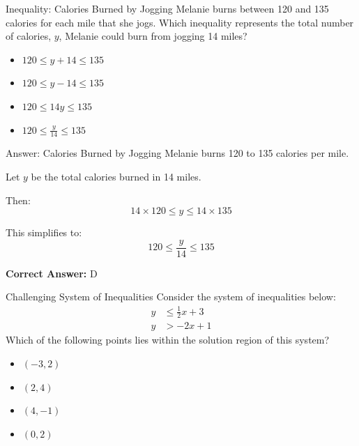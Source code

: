 \documentclass{beamer}
\begin{document}
\begin{frame}{Inequality: Calories Burned by Jogging}
Melanie burns between 120 and 135 calories for each mile that she jogs.  
Which inequality represents the total number of calories, \( y \),  
Melanie could burn from jogging 14 miles?

\vspace{1em}
\begin{itemize}
    \item[\textbf{A.}] \( 120 \leq y + 14 \leq 135 \)
    \item[\textbf{B.}] \( 120 \leq y - 14 \leq 135 \)
    \item[\textbf{C.}] \( 120 \leq 14y \leq 135 \)
    \item[\textbf{D.}] \( 120 \leq \frac{y}{14} \leq 135 \)
\end{itemize}
\end{frame}

\begin{frame}{Answer: Calories Burned by Jogging}
Melanie burns 120 to 135 calories per mile.

Let \( y \) be the total calories burned in 14 miles.

Then:
\[
14 \times 120 \leq y \leq 14 \times 135
\]

This simplifies to:
\[
120 \leq \frac{y}{14} \leq 135
\]

\textbf{Correct Answer:} \(\boxed{\text{D}}\)
\end{frame}

\begin{frame}{Challenging System of Inequalities}
    Consider the system of inequalities below:
    \[
    \begin{aligned}
    y &\leq \frac{1}{2}x + 3 \\
    y &> -2x + 1
    \end{aligned}
    \]
    Which of the following points lies within the solution region of this system?

    \vspace{1em}
    \begin{itemize}
        \item[\textbf{A.}] \((-3, 2)\)
        \item[\textbf{B.}] \((2, 4)\)
        \item[\textbf{C.}] \((4, -1)\)
        \item[\textbf{D.}] \((0, 2)\)
    \end{itemize}
\end{frame}
\end{document}
